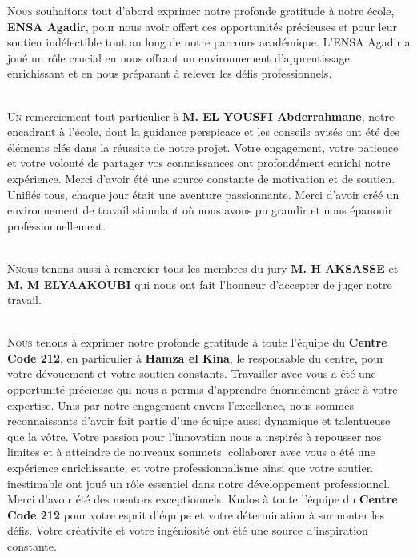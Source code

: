\documentclass[a4paper, 11pt, openany]{report}
\begin{document}
\newpage



\lettrine[nindent=0em, slope=-.5em]{\color{Eblue}N}{ous} souhaitons tout d'abord exprimer notre profonde gratitude à notre école, \textbf{ENSA Agadir}, pour nous avoir offert ces opportunités précieuses et pour leur soutien indéfectible tout au long de notre parcours académique. L'ENSA Agadir a joué un rôle crucial en nous offrant un environnement d'apprentissage enrichissant et en nous préparant à relever les défis professionnels.

\ \\

\lettrine[nindent=0em, slope=-.5em]{\color{Eblue}U}{n} remerciement tout particulier à \textbf{M. EL YOUSFI Abderrahmane}, notre encadrant à l'école, dont la guidance perspicace et les conseils avisés ont été des éléments clés dans la réussite de notre projet. Votre engagement, votre patience et votre volonté de partager vos connaissances ont profondément enrichi notre expérience. Merci d'avoir été une source constante de motivation et de soutien. Unifiés tous, chaque jour était une aventure passionnante. Merci d'avoir créé un environnement de travail stimulant où nous avons pu grandir et nous épanouir professionnellement.

\ \\

\lettrine[nindent=0em, slope=-.5em]{\color{Eblue}N}{n}ous tenons aussi à remercier tous les membres du jury \textbf{M. H AKSASSE} et \textbf{M. M ELYAAKOUBI} qui nous ont fait l’honneur d’accepter de juger notre travail.

\ \\

\lettrine[nindent=0em, slope=-.5em]{\color{Eblue}N}{ous} tenons à exprimer notre profonde gratitude à toute l'équipe du \textbf{Centre Code 212}, en particulier à \textbf{Hamza el Kina}, le responsable du centre, pour votre dévouement et votre soutien constants. Travailler avec vous a été une opportunité précieuse qui nous a permis d'apprendre énormément grâce à votre expertise. Unis par notre engagement envers l'excellence, nous sommes reconnaissants d'avoir fait partie d'une équipe aussi dynamique et talentueuse que la vôtre. Votre passion pour l'innovation nous a inspirés à repousser nos limites et à atteindre de nouveaux sommets. collaborer avec vous a été une expérience enrichissante, et votre professionnalisme ainsi que votre soutien inestimable ont joué un rôle essentiel dans notre développement professionnel. Merci d'avoir été des mentors exceptionnels. Kudos à toute l'équipe du \textbf{Centre Code 212} pour votre esprit d'équipe et votre détermination à surmonter les défis. Votre créativité et votre ingéniosité ont été une source d'inspiration constante.
\end{document}
